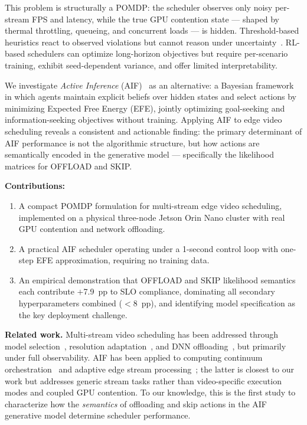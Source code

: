 \documentclass[conference]{IEEEtran}
\begin{document}
This problem is structurally a POMDP: the scheduler observes only noisy per-stream FPS and latency, while the true GPU contention state — shaped by thermal throttling, queueing, and concurrent loads — is hidden.
Threshold-based heuristics react to observed violations but cannot reason under uncertainty~\cite{mao2019learning}.
RL-based schedulers can optimize long-horizon objectives but require per-scenario training, exhibit seed-dependent variance, and offer limited interpretability.

We investigate \emph{Active Inference} (AIF)~\cite{friston2010free,parr2022active} as an alternative: a Bayesian framework in which agents maintain explicit beliefs over hidden states and select actions by minimizing Expected Free Energy (EFE), jointly optimizing goal-seeking and information-seeking objectives without training.
Applying AIF to edge video scheduling reveals a consistent and actionable finding: the primary determinant of AIF performance is not the algorithmic structure, but how actions are semantically encoded in the generative model — specifically the likelihood matrices for OFFLOAD and SKIP.

\textbf{Contributions:}
\begin{enumerate}[leftmargin=*,topsep=2pt,itemsep=0pt]
    \item A compact POMDP formulation for multi-stream edge video scheduling, implemented on a physical three-node Jetson Orin Nano cluster with real GPU contention and network offloading.
    \item A practical AIF scheduler operating under a 1-second control loop with one-step EFE approximation, requiring no training data.
    \item An empirical demonstration that OFFLOAD and SKIP likelihood semantics each contribute $+$7.9~pp to SLO compliance, dominating all secondary hyperparameters combined ($<$8~pp), and identifying model specification as the key deployment challenge.
\end{enumerate}

\textbf{Related work.}
Multi-stream video scheduling has been addressed through model selection~\cite{jiang2018chameleon}, resolution adaptation~\cite{zhang2017live}, and DNN offloading~\cite{kang2017neurosurgeon}, but primarily under full observability.
AIF has been applied to computing continuum orchestration~\cite{sedlak2024equilibrium} and adaptive edge stream processing~\cite{sedlak2024stream}; the latter is closest to our work but addresses generic stream tasks rather than video-specific execution modes and coupled GPU contention.
To our knowledge, this is the first study to characterize how the \emph{semantics} of offloading and skip actions in the AIF generative model determine scheduler performance.
\end{document}
